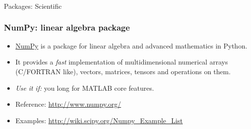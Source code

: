 \begin{frame}[fragile]\frametitle{}
\begin{center}
{\Large Packages: Scientific}
\end{center}
\end{frame}

\begin{frame}[fragile]\frametitle{NumPy: linear algebra package}

\begin{itemize}
\item     \href{http://www.numpy.org/}{NumPy} is a package for linear algebra
  and advanced mathematics in Python.

\item    
  It provides a \emph{fast} implementation of multidimensional
  numerical arrays (C/FORTRAN like), vectors, matrices, tensors and
  operations on them.

\item    
  \emph{Use it if:} you long for MATLAB core features.

  \item Reference: {\footnotesize\url{http://www.numpy.org/}}
  \item Examples: {\footnotesize\url{http://wiki.scipy.org/Numpy_Example_List}}
  \end{itemize}
\end{frame}

